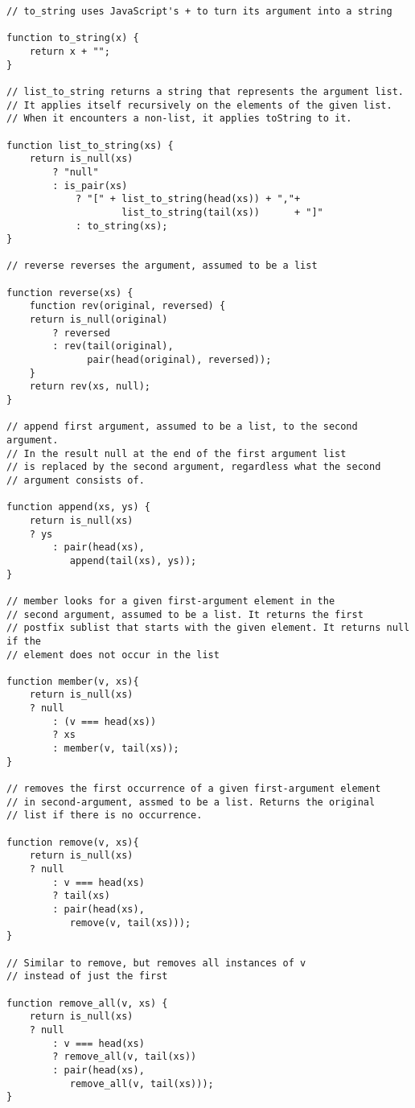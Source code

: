 \begin{lstlisting}
// to_string uses JavaScript's + to turn its argument into a string

function to_string(x) {
    return x + "";
}

// list_to_string returns a string that represents the argument list.
// It applies itself recursively on the elements of the given list.
// When it encounters a non-list, it applies toString to it.

function list_to_string(xs) {
    return is_null(xs)
        ? "null"
        : is_pair(xs)
            ? "[" + list_to_string(head(xs)) + ","+
                    list_to_string(tail(xs))      + "]"
            : to_string(xs);
}

// reverse reverses the argument, assumed to be a list

function reverse(xs) {
    function rev(original, reversed) {
	return is_null(original)
	    ? reversed
	    : rev(tail(original), 
	          pair(head(original), reversed));
    }
    return rev(xs, null);
}

// append first argument, assumed to be a list, to the second argument.
// In the result null at the end of the first argument list
// is replaced by the second argument, regardless what the second
// argument consists of.

function append(xs, ys) {
    return is_null(xs)
	? ys
        : pair(head(xs),
	       append(tail(xs), ys));
} 

// member looks for a given first-argument element in the 
// second argument, assumed to be a list. It returns the first 
// postfix sublist that starts with the given element. It returns null if the 
// element does not occur in the list

function member(v, xs){
    return is_null(xs)
	? null
        : (v === head(xs))
	    ? xs
	    : member(v, tail(xs));
}

// removes the first occurrence of a given first-argument element
// in second-argument, assmed to be a list. Returns the original 
// list if there is no occurrence.

function remove(v, xs){
    return is_null(xs)
	? null
        : v === head(xs)
	    ? tail(xs)
	    : pair(head(xs), 
		   remove(v, tail(xs)));
}

// Similar to remove, but removes all instances of v
// instead of just the first

function remove_all(v, xs) {
    return is_null(xs)
	? null
        : v === head(xs)
	    ? remove_all(v, tail(xs))
	    : pair(head(xs), 
	  	   remove_all(v, tail(xs)));
}


\end{lstlisting}
